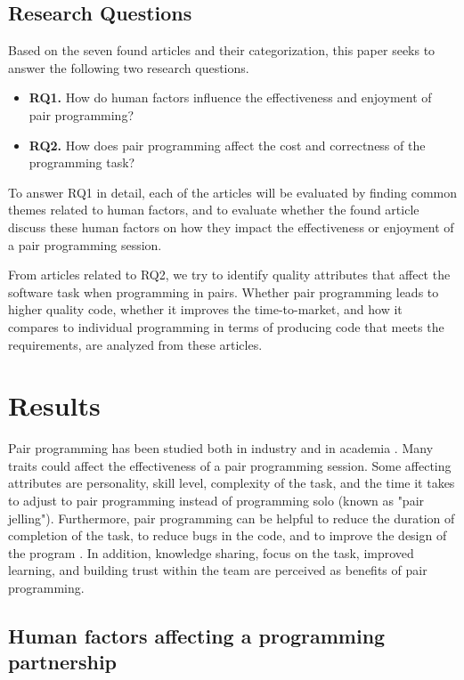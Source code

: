 \documentclass[conference]{IEEEtran}
\begin{document}
\subsection{Research Questions}

Based on the seven found articles and their categorization, this paper seeks to answer the following two research questions.

\begin{itemize}
    \item \textbf{RQ1.} How do human factors influence the effectiveness and enjoyment of pair programming?
    \item \textbf{RQ2.} How does pair programming affect the cost and correctness of the programming task?
\end{itemize}

To answer RQ1 in detail, each of the articles will be evaluated by finding common themes related to human factors, and to evaluate whether the found article discuss these human factors on how they impact the effectiveness or enjoyment of a pair programming session. 

From articles related to RQ2, we try to identify quality attributes that affect the software task when programming in pairs. Whether pair programming leads to higher quality code, whether it improves the time-to-market, and how it compares to individual programming in terms of producing code that meets the requirements, are analyzed from these articles.

\section{Results}

Pair programming has been studied both in industry and in academia \cite{Williams2000Strengthening, 10.1145/1414004.1414026, Hannay2009effectiveness}. Many traits could affect the effectiveness of a pair programming session. Some affecting attributes are personality, skill level, complexity of the task, and the time it takes to adjust to pair programming instead of programming solo (known as "pair jelling"). Furthermore, pair programming can be helpful to reduce the duration of completion of the task, to reduce bugs in the code, and to improve the design of the program \cite{10.1145/2652524.2652529}. In addition, knowledge sharing, focus on the task, improved learning, and building trust within the team are perceived as benefits of pair programming.


\subsection{Human factors affecting a programming partnership}
\end{document}
